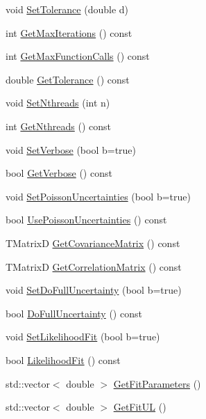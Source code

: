 \begin{DoxyCompactItemize}
\item 
void \hyperlink{classCoulExFitter_a9abeddb0f114d7dcc70309f03f54dd01}{Set\-Tolerance} (double d)
\item 
int \hyperlink{classCoulExFitter_abc2b196c4245b5c6f019a8a1f45eb00e}{Get\-Max\-Iterations} () const 
\item 
int \hyperlink{classCoulExFitter_a96352023871d7431849e35c23a59ee48}{Get\-Max\-Function\-Calls} () const 
\item 
double \hyperlink{classCoulExFitter_a6b78c02a350d2cdcaa42e105aab4cf88}{Get\-Tolerance} () const 
\item 
void \hyperlink{classCoulExFitter_a5ed39b91e4a9db0b148e3854dcf05d07}{Set\-Nthreads} (int n)
\item 
int \hyperlink{classCoulExFitter_a9e65723ca1492e71bd7f1ff9b457c1fb}{Get\-Nthreads} () const 
\item 
void \hyperlink{classCoulExFitter_aadbcd260ffdc402f24c122a549f08743}{Set\-Verbose} (bool b=true)
\item 
bool \hyperlink{classCoulExFitter_ad7f2ed3a90a161d3d7f8eb6571649da6}{Get\-Verbose} () const 
\item 
void \hyperlink{classCoulExFitter_a9e577fdf18978a59a8a3059522ba7355}{Set\-Poisson\-Uncertainties} (bool b=true)
\item 
bool \hyperlink{classCoulExFitter_af2820d3ab13fcc8df1eaee486d58fb09}{Use\-Poisson\-Uncertainties} () const 
\item 
T\-Matrix\-D \hyperlink{classCoulExFitter_a6d59f4e8c05a18c285972ea722e7a503}{Get\-Covariance\-Matrix} () const 
\item 
T\-Matrix\-D \hyperlink{classCoulExFitter_aeda72e2dee8b0aa45157cb4562f9aab3}{Get\-Correlation\-Matrix} () const 
\item 
void \hyperlink{classCoulExFitter_aacc37bb66234dbd3f235683cad8e1427}{Set\-Do\-Full\-Uncertainty} (bool b=true)
\item 
bool \hyperlink{classCoulExFitter_a4fd09244f82e3af46add6960543524d9}{Do\-Full\-Uncertainty} () const 
\item 
void \hyperlink{classCoulExFitter_a7fa4c365be49eb9f6cf47684ff6b15bc}{Set\-Likelihood\-Fit} (bool b=true)
\item 
bool \hyperlink{classCoulExFitter_a96b4e6bd340c279bc913e875d11eca7c}{Likelihood\-Fit} () const 
\item 
std\-::vector$<$ double $>$ \hyperlink{classCoulExFitter_a0e07d4efae33831d05b24b20359aac38}{Get\-Fit\-Parameters} ()
\item 
std\-::vector$<$ double $>$ \hyperlink{classCoulExFitter_a4e775dd9b516260f3763e7a20bab6eae}{Get\-Fit\-U\-L} ()

\end{DoxyCompactItemize}
